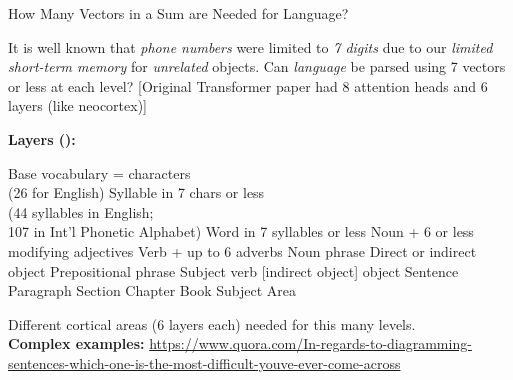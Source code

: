 \begin{slide}[\slideopts,toc={Language}]{How Many Vectors in a Sum are Needed for Language?}

\maybepause
\vspace{-1em}

It is well known that \emph{phone numbers} were limited to \emph{7
digits} due to our \emph{limited short-term memory} for \emph{unrelated}
objects. \maybepause Can \emph{language} be parsed using 7 vectors or
less at each level? [Original Transformer paper had 8 attention heads and 6 layers (like neocortex)]

\maybepause

\textbf{Layers (\eg):}
\vspace{-1em}
\begin{multicols}{2}
\begin{enumerate}
 \mpitem Base vocabulary = characters\\
  (26 for English)
  \mpitem Syllable in 7 chars or less\\
  (44 syllables in English;\\
   107 in Int'l Phonetic Alphabet)
  \mpitem Word in 7 syllables or less
  \mpitem Noun + 6 or less modifying adjectives
  \mpitem Verb + up to 6 adverbs
  \mpitem Noun phrase
  \columnbreak
  \mpitem Direct or indirect object
  \mpitem Prepositional phrase
  \mpitem Subject verb [indirect object] object
  \mpitem Sentence
  \mpitem Paragraph
  \mpitem Section
  \mpitem Chapter
  \mpitem Book
 \mpitem Subject Area %
\end{enumerate}
\end{multicols}
\maybepause
\vspace{-1em}
Different cortical areas (6 layers each) needed for this many levels.\\
\maybepause
\textbf{Complex examples:}
{\tiny
\url{https://www.quora.com/In-regards-to-diagramming-sentences-which-one-is-the-most-difficult-youve-ever-come-across}
}
\end{slide}

